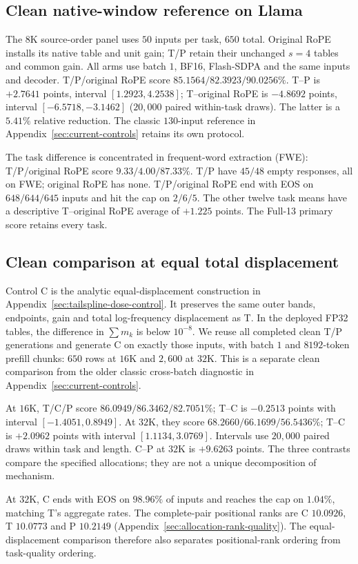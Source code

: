 \subsection{Clean native-window reference on Llama}
\label{sec:clean-native-new}
The $8$K source-order panel uses $50$ inputs per task, $650$ total. Original
RoPE installs its native table and unit gain; T/P retain their unchanged $s=4$
tables and common gain. All arms use batch $1$, BF16, Flash-SDPA and the same
inputs and decoder. T/P/original RoPE score $85.1564/82.3923/90.0256\%$.
T--P is $+2.7641$ points, interval $[1.2923,4.2538]$; T--original RoPE is
$-4.8692$ points, interval $[-6.5718,-3.1462]$ ($20{,}000$ paired within-task
draws). The latter is a $5.41\%$ relative reduction. The classic $130$-input
reference in Appendix~\ref{sec:current-controls} retains its own protocol.

The task difference is concentrated in frequent-word extraction (FWE):
T/P/original RoPE score $9.33/4.00/87.33\%$. T/P have $45/48$ empty responses,
all on FWE; original RoPE has none. T/P/original RoPE end with EOS on
$648/644/645$ inputs and hit the cap on $2/6/5$. The other twelve task
means have a descriptive T--original RoPE average of $+1.225$ points.
The Full-13 primary score retains every task.
\FloatBarrier

\subsection{Clean comparison at equal total displacement}
\label{sec:clean-shape-new}
Control C is the analytic equal-displacement construction in
Appendix~\ref{sec:tailspline-dose-control}. It preserves the same outer bands,
endpoints, gain and total log-frequency displacement as T. In the deployed
FP32 tables, the difference in $\sum m_k$ is below $10^{-8}$.
We reuse all completed clean T/P generations and generate C on exactly those
inputs, with batch $1$ and $8192$-token prefill chunks: $650$ rows at $16$K
and $2{,}600$ at $32$K. This is a separate clean comparison from the older
classic cross-batch diagnostic in Appendix~\ref{sec:current-controls}.

At $16$K, T/C/P score $86.0949/86.3462/82.7051\%$; T--C is $-0.2513$
points with interval $[-1.4051,0.8949]$. At $32$K, they score
$68.2660/66.1699/56.5436\%$; T--C is $+2.0962$ points with interval
$[1.1134,3.0769]$. Intervals use $20{,}000$ paired draws within task and
length. C--P at $32$K is $+9.6263$ points. The three contrasts compare the
specified allocations; they are not a unique decomposition of mechanism.

At $32$K, C ends with EOS on $98.96\%$ of inputs and reaches the cap on
$1.04\%$, matching T's aggregate rates. The complete-pair positional ranks
are C $10.0926$, T $10.0773$ and P $10.2149$
(Appendix~\ref{sec:allocation-rank-quality}). The equal-displacement comparison
therefore also separates positional-rank ordering from task-quality ordering.
\FloatBarrier

